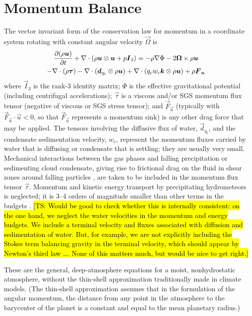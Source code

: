 \documentclass{report}
\begin{document}
\section{Momentum Balance}

The vector invariant form of the conservation law for momentum in a coordinate system rotating with constant angular velocity $\vec{\Omega}$ is 
\begin{multline}
\frac{\partial (\rho\boldsymbol{{u}})}{\partial t} + \nabla \cdot \left( \rho\boldsymbol{{u}} \otimes \boldsymbol{{u}} + p \boldsymbol{{I}}_3\right) =
- \rho \nabla\Phi - 2\boldsymbol{{\Omega}} \times \rho\boldsymbol{{u}} \\
- \nabla \cdot (\rho \boldsymbol{{\tau}}) - \nabla \cdot\left( \boldsymbol{{d}}_{q_t} \otimes \rho\boldsymbol{{u}} \right) + \nabla \cdot \left( q_c w_c \boldsymbol{{k}} \otimes \rho \boldsymbol{{u}} \right) + \rho \boldsymbol{{F}}_{\boldsymbol{{u}}}
\label{eq:governing_equations/momentum}
\end{multline}
where $\vec{I}_3$ is the rank-3 identity matrix; $\Phi$ is the effective gravitational potential (including centrifugal accelerations); $\vec{\tau}$ is a viscous and/or SGS momentum flux tensor (negative of viscous or SGS stress tensor); and $\vec{F}_{\vec{u}}$ (typically with $\vec{F}_{\vec{u}}\cdot\vec{u}<0$, so that $\vec{F}_{\vec{u}}$ represents a momentum sink) is any other drag force that may be applied. The tensors involving the diffusive flux of water, $\vec{d}_{q_t}$, and the condensate sedimentation velocity,  $w_c$, represent the momentum fluxes carried by water that is diffusing or condensate that is settling; they are usually very small. Mechanical interactions between the gas phases and falling precipitation or sedimenting cloud condensate, giving rise to frictional drag on the fluid in shear zones around falling particles \citep{Pauluis00}, are taken to be included in the momentum flux tensor $\vec{\tau}$. Momentum and kinetic energy transport by precipitating hydrometeors is neglected; it is 3--4 orders of magnitude smaller than other terms in the budgets \citep{Romps08a}. \hl{[TS: Would be good to check whether this is internally consistent: on the one hand, we neglect the water velocities in the  momentum and energy budgets. We include a terminal velocity and fluxes associated with diffusion and sedimentation of water. But, for example, we are not explicitly including the Stokes term balancing gravity in the terminal velocity, which should appear by Newton's third law \dots. None of this matters much, but would be nice to get right.]} 

These are the general, deep-atmosphere equations for a moist, nonhydrostatic atmosphere, without the thin-shell approximation traditionally made in climate models. (The thin-shell approximation assumes that in the formulation of the angular momentum, the distance from any point in the atmosphere to the barycenter of the planet is a constant and equal to the mean planetary radius.)
\end{document}
